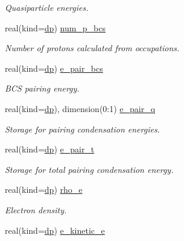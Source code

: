 \begin{DoxyCompactItemize}
\begin{DoxyCompactList}\small\item\em Quasiparticle energies. \end{DoxyCompactList}\item 
real(kind=\mbox{\hyperlink{namespaceparameters_a52f8c6351fd79345d8811e065bcbbb37}{dp}}) \mbox{\hyperlink{group__PAIRING_gaedb771510f7d66badb70bbe3e2ad28c2}{num\+\_\+p\+\_\+bcs}}
\begin{DoxyCompactList}\small\item\em Number of protons calculated from occupations. \end{DoxyCompactList}\item 
real(kind=\mbox{\hyperlink{namespaceparameters_a52f8c6351fd79345d8811e065bcbbb37}{dp}}) \mbox{\hyperlink{group__PAIRING_gae25457a2576ddbfa6a0c4bda3f4f7f58}{e\+\_\+pair\+\_\+bcs}}
\begin{DoxyCompactList}\small\item\em B\+CS pairing energy. \end{DoxyCompactList}\item 
real(kind=\mbox{\hyperlink{namespaceparameters_a52f8c6351fd79345d8811e065bcbbb37}{dp}}), dimension(0\+:1) \mbox{\hyperlink{group__PAIRING_ga9bc3597a7161607a24ef358150c703b1}{e\+\_\+pair\+\_\+q}}
\begin{DoxyCompactList}\small\item\em Storage for pairing condensation energies. \end{DoxyCompactList}\item 
real(kind=\mbox{\hyperlink{namespaceparameters_a52f8c6351fd79345d8811e065bcbbb37}{dp}}) \mbox{\hyperlink{group__PAIRING_ga7791448dd4d929ad8528cfb98b9f984b}{e\+\_\+pair\+\_\+t}}
\begin{DoxyCompactList}\small\item\em Storage for total pairing condensation energy. \end{DoxyCompactList}\item 
real(kind=\mbox{\hyperlink{namespaceparameters_a52f8c6351fd79345d8811e065bcbbb37}{dp}}) \mbox{\hyperlink{group__ELECTRONS_ga395bd413249aeecf9cdbad4ff0740d03}{rho\+\_\+e}}
\begin{DoxyCompactList}\small\item\em Electron density. \end{DoxyCompactList}\item 
real(kind=\mbox{\hyperlink{namespaceparameters_a52f8c6351fd79345d8811e065bcbbb37}{dp}}) \mbox{\hyperlink{group__ELECTRONS_ga3fd2374e88574f66a4a05db80b0c045b}{e\+\_\+kinetic\+\_\+e}}

\end{DoxyCompactItemize}
